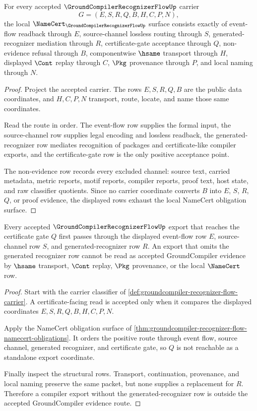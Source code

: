 \begin{theorem}
\label{thm:groundcompiler-recognizer-flow-namecert-obligations}
For every accepted $\GroundCompilerRecognizerFlowUp$ carrier
$$
G=(E,S,R,Q,B,H,C,P,N),
$$
the local $\NameCert_{\GroundCompilerRecognizerFlowUp}$ surface consists exactly of event-flow readback through $E$, source-channel lossless routing through $S$, generated-recognizer mediation through $R$, certificate-gate acceptance through $Q$, non-evidence refusal through $B$, componentwise $\hsame$ transport through $H$, displayed $\Cont$ replay through $C$, $\Pkg$ provenance through $P$, and local naming through $N$.
\end{theorem}
\begin{proof}
Project the accepted carrier. The rows $E,S,R,Q,B$ are the public data coordinates, and $H,C,P,N$ transport, route, locate, and name those same coordinates.

Read the route in order. The event-flow row supplies the formal input, the source-channel row supplies legal encoding and lossless readback, the generated-recognizer row mediates recognition of packages and certificate-like compiler exports, and the certificate-gate row is the only positive acceptance point.

The non-evidence row records every excluded channel: source text, carried metadata, metric reports, motif reports, compiler reports, proof text, host state, and raw classifier quotients. Since no carrier coordinate converts $B$ into $E$, $S$, $R$, $Q$, or proof evidence, the displayed rows exhaust the local NameCert obligation surface.
\end{proof}

\begin{theorem}
\label{thm:groundcompiler-recognizer-flow-certificate-gate-exactness}
Every accepted $\GroundCompilerRecognizerFlowUp$ export that reaches the certificate gate $Q$ first passes through the displayed event-flow row $E$, source-channel row $S$, and generated-recognizer row $R$. An export that omits the generated recognizer row cannot be read as accepted GroundCompiler evidence by $\hsame$ transport, $\Cont$ replay, $\Pkg$ provenance, or the local $\NameCert$ row.
\end{theorem}
\begin{proof}
Start with the carrier classifier of \autoref{def:groundcompiler-recognizer-flow-carrier}. A certificate-facing read is accepted only when it compares the displayed coordinates $E,S,R,Q,B,H,C,P,N$.

Apply the NameCert obligation surface of \autoref{thm:groundcompiler-recognizer-flow-namecert-obligations}. It orders the positive route through event flow, source channel, generated recognizer, and certificate gate, so $Q$ is not reachable as a standalone export coordinate.

Finally inspect the structural rows. Transport, continuation, provenance, and local naming preserve the same packet, but none supplies a replacement for $R$. Therefore a compiler export without the generated-recognizer row is outside the accepted GroundCompiler evidence route.
\end{proof}

